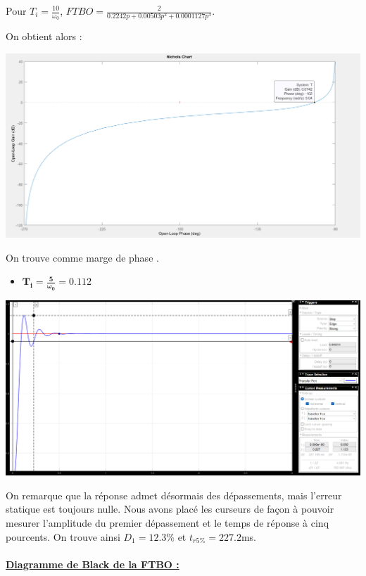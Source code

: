 \documentclass[12pt]{article}
\begin{document}
\begin{center}
    \normalsize Pour $T_i = \frac{10}{\omega_0}$, \large $FTBO = \frac{2}{0.2242p + 0.00503p^2 + 0.0001127p^3}$.
\end{center}
\normalsize On obtient alors :
\begin{center}
    \includegraphics[width = 16 cm]{TP2 Simulink/Syst_2/nichols_Ti=10_sur_omega0.png}
\end{center}
On trouve comme marge de phase .
\newpage
\begin{itemize}
    \item \large $\mathbf{T_i = \frac{5}{\omega_0} = 0.112}$
\end{itemize}
\begin{center}
    \includegraphics[width = 16 cm]{TP2 Simulink/Syst_2/tr5prct_et_depassement_4.2_5_sur_omega0.png}

\end{center}
On remarque que la réponse admet désormais des dépassements, mais l'erreur statique est toujours nulle. Nous avons placé les curseurs de façon à pouvoir mesurer l'amplitude du premier dépassement et le temps de réponse à cinq pourcents.
On trouve ainsi $D_1 = 12.3\%$ et $t_{r5\%} = 227.2$ms.
\\\\\underline{\bf Diagramme de Black de la FTBO :}
\end{document}
